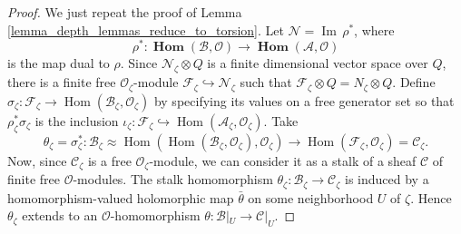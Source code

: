 \documentclass{amsart}
\numberwithin{equation}{section}
\theoremstyle{definition}
\theoremstyle{plain}
\theoremstyle{remark}
\begin{document}
\begin{proof}
We just repeat the proof of Lemma \ref{lemma_depth_lemmas_reduce_to_torsion}.
Let ${\ensuremath{\mathcal{{N}}}}={{\mathop{\mathrm{Im\,}}}} \rho^*$, where 
\[
\rho^*:
{{\mathop{\mathbf{Hom}}}}({\ensuremath{\mathcal{{B}}}},{\ensuremath{\mathcal{{O}}}})\rightarrow{{\mathop{\mathbf{Hom}}}}({\ensuremath{\mathcal{{A}}}},{\ensuremath{\mathcal{{O}}}})
\]
 is the map dual
to $\rho$.
Since ${\ensuremath{\mathcal{{N}}}}_\zeta\otimes Q$ is a finite dimensional 
vector space
over $Q$, there is a finite free ${\ensuremath{\mathcal{{O}}}}_\zeta$-module 
${\ensuremath{\mathcal{{F}}}}_\zeta\hookrightarrow {\ensuremath{\mathcal{{N}}}}_\zeta$ such that ${\ensuremath{\mathcal{{F}}}}_\zeta\otimes Q=N_\zeta\otimes Q$. Define 
$\sigma_\zeta: {\ensuremath{\mathcal{{F}}}}_\zeta \rightarrow 
		{{\mathop{\mathrm{Hom}}}}({\ensuremath{\mathcal{{B}}}}_\zeta,{\ensuremath{\mathcal{{O}}}}_\zeta)$
by specifying its values on a free generator set so that
$\rho_\zeta^*\sigma_\zeta$ is the inclusion $\iota_\zeta:{\ensuremath{\mathcal{{F}}}}_\zeta\hookrightarrow{{\mathop{\mathrm{Hom}}}}({\ensuremath{\mathcal{{A}}}}_\zeta,{\ensuremath{\mathcal{{O}}}}_\zeta)$.
Take 
\[
	\theta_\zeta=\sigma^*_\zeta:
 		{\ensuremath{\mathcal{{B}}}}_\zeta\approx 
		{{\mathop{\mathrm{Hom}}}}({{\mathop{\mathrm{Hom}}}}({\ensuremath{\mathcal{{B}}}}_\zeta,{\ensuremath{\mathcal{{O}}}}_\zeta),{\ensuremath{\mathcal{{O}}}}_\zeta)
 			\rightarrow
		{{\mathop{\mathrm{Hom}}}}({\ensuremath{\mathcal{{F}}}}_\zeta,{\ensuremath{\mathcal{{O}}}}_\zeta)={\ensuremath{\mathcal{{C}}}}_\zeta.
\]
Now, since ${\ensuremath{\mathcal{{C}}}}_\zeta$ is a free ${\ensuremath{\mathcal{{O}}}}_\zeta$-module, we can consider
it as a stalk of a sheaf ${\ensuremath{\mathcal{{C}}}}$ of finite free ${\ensuremath{\mathcal{{O}}}}$-modules.
The stalk homomorphism $\theta_\zeta:{\ensuremath{\mathcal{{B}}}}_\zeta\rightarrow{\ensuremath{\mathcal{{C}}}}_\zeta$
is induced by a homomorphism-valued holomorphic map $\bar\theta$ on some neighborhood $U$ of $\zeta$. 
Hence $\theta_\zeta$ extends to an  ${\ensuremath{\mathcal{{O}}}}$-homomorphism
$\theta:{\ensuremath{\mathcal{{B}}}}|_U\rightarrow{\ensuremath{\mathcal{{C}}}}|_U$. 


\end{proof}
\end{document}
